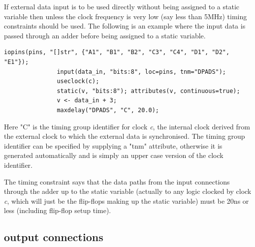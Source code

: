             If external data input is to be used directly without being
            assigned to a static variable then unless the clock
            frequency is very low (say less than 5MHz) timing constraints
            should be used. The following is an example where the input data
            is passed through an adder before being assigned to a static
            variable.
            \begin{lstlisting}[gobble=12, language=threepl]
               iopins(pins, "[]str", {"A1", "B1", "B2", "C3", "C4", "D1", "D2", "E1"});
               input(data_in, "bits:8", loc=pins, tnm="DPADS");
               useclock(c);
               static(v, "bits:8"); attributes(v, continuous=true);
               v <- data_in + 3;
               maxdelay("DPADS", "C", 20.0);
            \end{lstlisting}
            Here "C" is the timing group identifier for clock {\em c}, the internal
            clock derived from the external clock to which the external data is
            synchronised. The timing group identifier can be specified by supplying a
            "tnm" attribute, otherwise it is generated automatically and is simply an
            upper case version of the clock identifier.
            
            The timing constraint says that the data paths from the input connections
            through the adder up to the static variable (actually to any logic
            clocked by clock {\em c}, which will just be the flip-flops making up the
            static variable) must be 20ns or less (including flip-flop setup time).

        \subsection{output connections}

